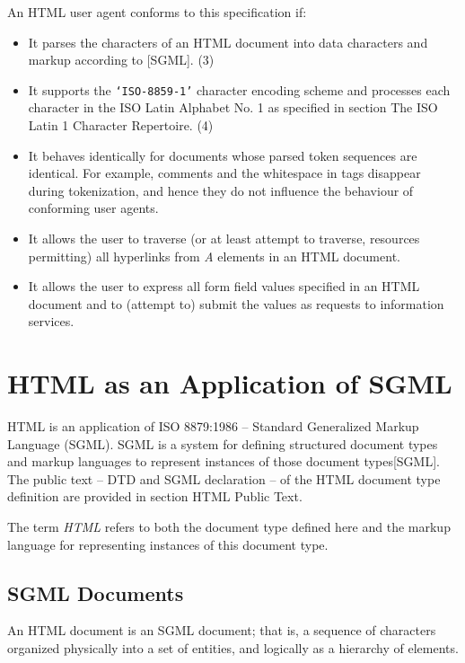 An HTML user agent conforms to this specification if:
\par \begin{itemize}\item 
It parses the characters of an HTML document into data characters
and markup according to [SGML].
(3)\item 
It supports the {\tt `ISO-8859-1'} character encoding scheme and
processes each character in the ISO Latin Alphabet No.  1 as specified
in section The ISO Latin 1 Character Repertoire.
(4)\item 
It behaves identically for documents whose parsed token sequences
are identical.
For example, comments and the whitespace in tags disappear during
tokenization, and hence they do not influence the behaviour of
conforming user agents.
\item 
It allows the user to traverse (or at least attempt to traverse,
resources permitting) all hyperlinks from {\it A} elements in an HTML
document.
\item 
It allows the user to express all form field values specified in
an HTML document and to (attempt to) submit the values as requests to
information services.
\end{itemize}\section*{HTML as an Application of SGML}\par 
HTML is an application of ISO 8879:1986 -- Standard
Generalized Markup Language (SGML).  SGML is a system for defining
structured document types and markup languages to represent instances
of those document types[SGML].  The public text -- DTD and SGML
declaration -- of the HTML document type definition are provided in
section HTML Public Text.
\par \par 
The term {\it HTML} refers to both the document type defined here and
the markup language for representing instances of this document type.
\par \subsection*{SGML Documents}\par 
An HTML document is an SGML document;  that is, a sequence of
characters organized physically into a set of entities, and logically
as a hierarchy of elements.
\par \par 
